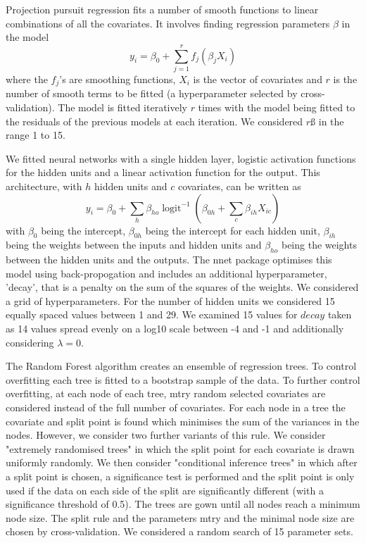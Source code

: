 \documentclass[review]{elsarticle}
\begin{document}
Projection pursuit regression fits a number of smooth functions to linear combinations of all the covariates. 
It involves finding regression parameters $\beta$ in the model
$$y_i = \beta_0 + \sum_{j=1}^r f_j(\beta_j X_i) $$
where the $f_j$'s are smoothing functions, $X_i$ is the vector of covariates and $r$ is the number of smooth terms to be fitted (a hyperparameter selected by cross-validation). 
The model is fitted iteratively $r$ times with the model being fitted to the residuals of the previous models at each iteration.
We considered  $r$ß in the range 1 to 15.

We fitted neural networks with a single hidden layer, logistic activation functions for the hidden units and a linear activation function for the output.
This architecture, with $h$ hidden units and $c$ covariates, can be written as
$$y_i = \beta_0 + \sum_h \beta_{ho} \operatorname{logit}^{-1}\left(\beta_{0h} + \sum_c \beta_{ih}X_{ic}\right)$$
with $\beta_0$ being the intercept, $\beta_{0h}$ being the intercept for each hidden unit, $\beta_{ih}$ being the weights between the inputs and hidden units and $\beta_{ho}$ being the weights between the hidden units and the outputs.
The nnet package optimises this model using back-propogation and includes an additional hyperparameter, 'decay', that is a penalty on the sum of the squares of the weights.
We considered a grid of hyperparameters.
For the number of hidden units we considered 15 equally spaced values between 1 and 29.
We examined 15 values for $decay$ taken as 14 values spread evenly on a log10 scale between -4 and -1 and additionally considering $\lambda = 0$.


The Random Forest algorithm creates an ensemble of regression trees.
To control overfitting each tree is fitted to a bootstrap sample of the data.
To further control overfitting, at each node of each tree, mtry random selected covariates are considered instead of the full number of covariates.
For each node in a tree the covariate and split point is found which minimises the sum of the variances in the nodes.
However, we consider two further variants of this rule.
We consider "extremely randomised trees" in which the split point for each covariate is drawn uniformly randomly.
We then consider "conditional inference trees" in which after a split point is chosen, a significance test is performed and the split point is only used if the data on each side of the split are significantly different (with a significance threshold of 0.5).
The trees are gown until all nodes reach a minimum node size.
The  split rule and the parameters mtry and the minimal node size are chosen by cross-validation.
We considered a random search of 15 parameter sets.
\end{document}
